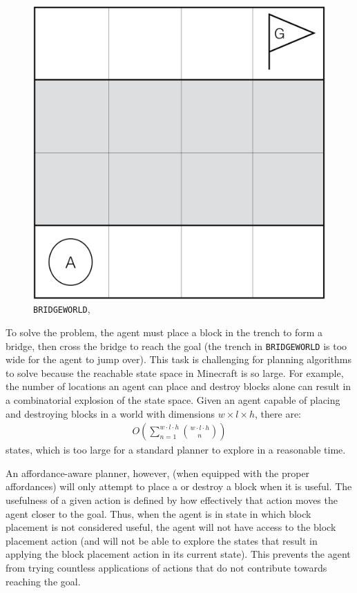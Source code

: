 \documentclass[]{article}
\begin{document}
\begin{figure}
\centering
\includegraphics[scale=0.2]{figures/bridgeworld.png}
\caption{\texttt{BRIDGEWORLD},
\label{fig:bridgeworld}}
\end{figure}

To solve the problem, the agent must place a block in the trench to
form a bridge, then cross the bridge to reach the goal (the trench in \texttt{BRIDGEWORLD} 
is too wide for the agent to jump over).  This task is
challenging for planning algorithms to solve because the reachable
state space in Minecraft is so large. For example, the number of
locations an agent can place and destroy blocks alone can result in a
combinatorial explosion of the state space. Given an
agent capable of placing and destroying blocks in a world with dimensions
$w \times l \times h$, there are:
\begin{align}
O\left(\sum_{n=1}^{w \cdot l \cdot h} \binom{w \cdot l \cdot h}{n}\right)
\label{eq:mc_explode}
\end{align}
states, which is too large for a standard planner to explore in a
reasonable time.

An affordance-aware planner, however, (when equipped with the proper
affordances) will only attempt to place a or destroy a block when it is useful.
The usefulness of a given action is defined by how effectively that action moves 
the agent closer to the goal. Thus, when the agent is in state in which block
placement is not considered useful, the agent will not have access to the block 
placement action (and will not be able to explore the states that result in 
applying the block placement action in its current state). This prevents the 
agent from trying countless applications of actions that do not contribute 
towards reaching the goal.
\end{document}
